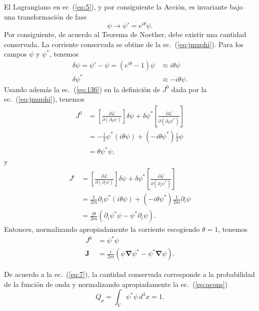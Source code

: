 \begin{subappendices}
El Lagrangiano en ec~(\ref{eq:5}), y por consiguiente la Acci\'on, es invariante bajo una transformaci\'on de fase
\begin{equation}
  \label{eq:6}
  \psi\to\psi'=e^{i\theta}\psi.
\end{equation}
Por consiguiente, de acuerdo al Teorema de Noether, debe existir una cantidad conservada. La corriente conservada se obtine de la ec.~(\ref{eq:jmuphi}). Para los campos $\psi$ y $\psi^*$, tenemos
\begin{align}
  \delta\psi=\psi'-\psi=(e^{i\theta}-1)\psi&\approx i\theta\psi\\
  \delta\psi^*&\approx-i\theta\psi.
\end{align}
Usando adem\'as la ec.~(\ref{eq:136}) en la definici\'on de $J^0$ dada por la ec.~(\ref{eq:jmuphi}), tenemos
\begin{align}
  \label{eq:135}
  J^0&=\left[\frac{\partial\mathcal{L}}{\partial(\partial_0\psi)}\right]\delta\psi
  +\delta\psi^*\left[\frac{\partial\mathcal{L}}{\partial(\partial_0\psi^*)}\right]\nonumber\\
  &=-\frac{i}{2}\psi^*(i\theta\psi)+(-i\theta\psi^*)\frac{i}{2}\psi\nonumber\\
  &=\theta\psi^*\psi,
\end{align}
y
\begin{align}
  \label{eq:134}
  J^i&=\left[\frac{\partial\mathcal{L}}{\partial(\partial_i\psi)}\right]\delta\psi
  +\delta\psi^*\left[\frac{\partial\mathcal{L}}{\partial(\partial_i\psi^*)}\right]\nonumber\\
  &=\frac{1}{2m}\partial_i\psi^*(i\theta\psi)+(-i\theta\psi^*)\frac{1}{2m}\partial_i\psi\nonumber\\
  &=\frac{i\theta}{2m}\left(\partial_i\psi^*\psi-\psi^*\partial_i\psi \right).
\end{align}
Entonces, normalizando apropiadamente la corriente escogiendo $\theta=1$, tenemos
\begin{align}
  \label{eq:7}
  J^0&=\psi^*\psi\\
  \mathbf{J}&=\frac{i}{2m}
  \left(
    \psi\boldsymbol{\nabla}\psi^*-\psi^*\boldsymbol{\nabla}\psi
  \right).
\end{align}
\begin{frame}
De acuerdo a la ec.~(\ref{eq:7}), la cantidad conservada corresponde a la probabilidad de la funci\'on de onda y normalizando apropiadamente la ec.~(\ref{eq:qcons})
\begin{equation}
  \label{eq:57}
Q_\rho=  \int_V \psi^*\psi \,d^3x=1.
\end{equation}
\end{frame}


\end{subappendices}
